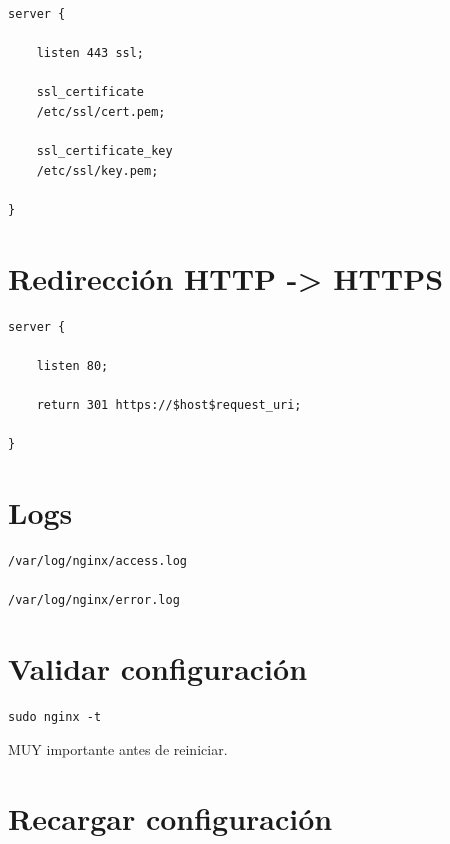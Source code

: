 \documentclass[a4paper,11pt]{article}
\begin{document}
\begin{lstlisting}
server {

    listen 443 ssl;

    ssl_certificate
    /etc/ssl/cert.pem;

    ssl_certificate_key
    /etc/ssl/key.pem;

}
\end{lstlisting}


\section*{Redirección HTTP -> HTTPS}

\begin{lstlisting}
server {

    listen 80;

    return 301 https://$host$request_uri;

}
\end{lstlisting}


\section*{Logs}

\begin{lstlisting}
/var/log/nginx/access.log

/var/log/nginx/error.log
\end{lstlisting}


\section*{Validar configuración}

\begin{lstlisting}
sudo nginx -t
\end{lstlisting}

MUY importante antes de reiniciar.


\section*{Recargar configuración}
\end{document}
